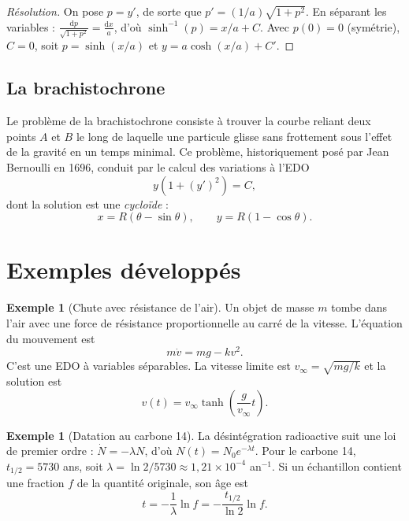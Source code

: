 \documentclass[12pt,a4paper,openany]{book}
\theoremstyle{definition}
\newtheorem{exemple}[definition]{Exemple}
\theoremstyle{plain}
\theoremstyle{remark}
\newcommand{\dd}{\mathrm{d}}
\begin{document}
\begin{proof}[Résolution]
On pose $p = y'$, de sorte que $p' = (1/a)\sqrt{1+p^2}$. En séparant
les variables : $\frac{\dd p}{\sqrt{1+p^2}} = \frac{\dd x}{a}$, d'où
$\sinh^{-1}(p) = x/a + C$. Avec $p(0) = 0$ (symétrie), $C = 0$, soit
$p = \sinh(x/a)$ et $y = a\cosh(x/a) + C'$.
\end{proof}

\subsection{La brachistochrone}
\label{subsec:brachistochrone}

Le problème de la brachistochrone consiste à trouver la courbe reliant
deux points $A$ et $B$ le long de laquelle une particule glisse sans
frottement sous l'effet de la gravité en un temps minimal. Ce
problème, historiquement posé par Jean Bernoulli en 1696, conduit par
le calcul des variations à l'EDO
\[
y(1 + (y')^2) = C,
\]
dont la solution est une \emph{cycloïde} :
\[
x = R(\theta - \sin\theta), \qquad y = R(1 - \cos\theta).
\]

\section{Exemples développés}
\label{sec:exemples-app}

\begin{exemple}[Chute avec résistance de l'air]
\label{ex:chute-air}
Un objet de masse $m$ tombe dans l'air avec une force de résistance
proportionnelle au carré de la vitesse. L'équation du mouvement est
\[
m\dot{v} = mg - kv^2.
\]
C'est une EDO à variables séparables. La vitesse limite est
$v_\infty = \sqrt{mg/k}$ et la solution est
\[
v(t) = v_\infty \tanh\!\left(\frac{g}{v_\infty}t\right).
\]
\end{exemple}

\begin{exemple}[Datation au carbone 14]
\label{ex:carbone14}
La désintégration radioactive suit une loi de premier ordre :
$\dot{N} = -\lambda N$, d'où $N(t) = N_0 e^{-\lambda t}$.
Pour le carbone 14, $t_{1/2} = 5730$ ans, soit
$\lambda = \ln 2 / 5730 \approx 1{,}21 \times 10^{-4}$ an$^{-1}$.
Si un échantillon contient une fraction $f$ de la quantité originale,
son âge est
\[
t = -\frac{1}{\lambda}\ln f = -\frac{t_{1/2}}{\ln 2}\ln f.
\]
\end{exemple}
\end{document}

